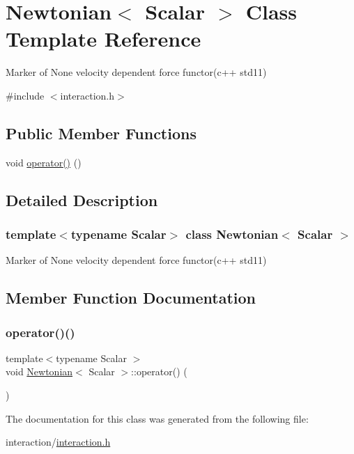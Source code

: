 \hypertarget{class_newtonian}{}\section{Newtonian$<$ Scalar $>$ Class Template Reference}
\label{class_newtonian}


Marker of None velocity dependent force functor(c++ std11)  




{\ttfamily \#include $<$interaction.\+h$>$}

\subsection*{Public Member Functions}
\begin{DoxyCompactItemize}
\item 
void \mbox{\hyperlink{class_newtonian_a13f6ce2d08ba777301542e001eab5f9b}{operator()}} ()
\end{DoxyCompactItemize}


\subsection{Detailed Description}
\subsubsection*{template$<$typename Scalar$>$\newline
class Newtonian$<$ Scalar $>$}

Marker of None velocity dependent force functor(c++ std11) 

\subsection{Member Function Documentation}
\mbox{\label{class_newtonian_a13f6ce2d08ba777301542e001eab5f9b}} 
\subsubsection{\texorpdfstring{operator()()}{operator()()}}
{\footnotesize\ttfamily template$<$typename Scalar $>$ \\
void \mbox{\hyperlink{class_newtonian}{Newtonian}}$<$ Scalar $>$\+::operator() (\begin{DoxyParamCaption}{ }\end{DoxyParamCaption})\hspace{0.3cm}{\ttfamily [inline]}}



The documentation for this class was generated from the following file\+:\begin{DoxyCompactItemize}
\item 
interaction/\mbox{\hyperlink{interaction_8h}{interaction.\+h}}\end{DoxyCompactItemize}
